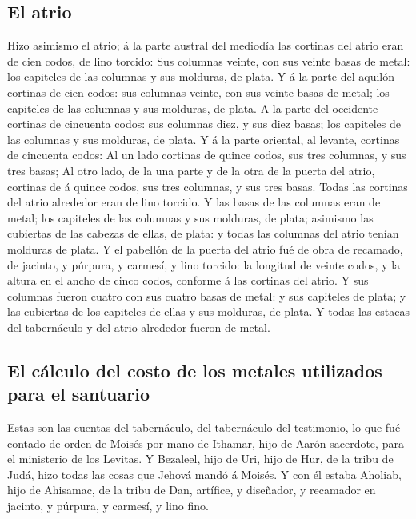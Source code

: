 \hypertarget{el-atrio}{%
\subsection{El atrio}\label{el-atrio}}

 Hizo asimismo el atrio; á la parte austral del mediodía las
cortinas del atrio eran de cien codos, de lino torcido: 
Sus columnas veinte, con sus veinte basas de metal: los capiteles de las
columnas y sus molduras, de plata.  Y á la parte del
aquilón cortinas de cien codos: sus columnas veinte, con sus veinte
basas de metal; los capiteles de las columnas y sus molduras, de plata.
 A la parte del occidente cortinas de cincuenta codos: sus
columnas diez, y sus diez basas; los capiteles de las columnas y sus
molduras, de plata.  Y á la parte oriental, al levante,
cortinas de cincuenta codos:  Al un lado cortinas de quince
codos, sus tres columnas, y sus tres basas;  Al otro lado,
de la una parte y de la otra de la puerta del atrio, cortinas de á
quince codos, sus tres columnas, y sus tres basas.  Todas
las cortinas del atrio alrededor eran de lino torcido.  Y
las basas de las columnas eran de metal; los capiteles de las columnas y
sus molduras, de plata; asimismo las cubiertas de las cabezas de ellas,
de plata: y todas las columnas del atrio tenían molduras de plata.
 Y el pabellón de la puerta del atrio fué de obra de
recamado, de jacinto, y púrpura, y carmesí, y lino torcido: la longitud
de veinte codos, y la altura en el ancho de cinco codos, conforme á las
cortinas del atrio.  Y sus columnas fueron cuatro con sus
cuatro basas de metal: y sus capiteles de plata; y las cubiertas de los
capiteles de ellas y sus molduras, de plata.  Y todas las
estacas del tabernáculo y del atrio alrededor fueron de metal.

\hypertarget{el-cuxe1lculo-del-costo-de-los-metales-utilizados-para-el-santuario}{%
\subsection{El cálculo del costo de los metales utilizados para el
santuario}\label{el-cuxe1lculo-del-costo-de-los-metales-utilizados-para-el-santuario}}

 Estas son las cuentas del tabernáculo, del tabernáculo del
testimonio, lo que fué contado de orden de Moisés por mano de Ithamar,
hijo de Aarón sacerdote, para el ministerio de los Levitas.
 Y Bezaleel, hijo de Uri, hijo de Hur, de la tribu de Judá,
hizo todas las cosas que Jehová mandó á Moisés.  Y con él
estaba Aholiab, hijo de Ahisamac, de la tribu de Dan, artífice, y
diseñador, y recamador en jacinto, y púrpura, y carmesí, y lino fino.

